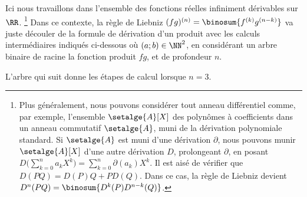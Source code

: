 Ici nous travaillons dans l'ensemble des fonctions réelles infiniment dérivables sur $\RR$.%
\footnote{
	Plus généralement, nous pouvons considérer tout anneau différentiel comme, par exemple, l'ensemble $\setalge{A}[X]$ des polynômes à coefficients dans un anneau commutatif $\setalge{A}$, muni de la dérivation polynomiale standard.
	Si $\setalge{A}$ est muni d'une dérivation $\partial$,
	nous pouvons munir $\setalge{A}[X]$ d'une autre dérivation $D$, prolongeant $\partial$, en posant
	$D \big( \sum_{k=0}^n a_k X^k \big) = \sum_{k=0}^n \partial(a_k) X^k$.
	Il est aisé de vérifier que $D(PQ) = D(P) Q + P D(Q)$.
	Dans ce cas, la règle de Liebniz devient $D^n(PQ) = \binosum{D^k(P) D^{n-k}(Q)}$.
}
Dans ce contexte,
la règle de Liebniz $(fg)^{(n)} = \binosum{f^{(k)} g^{(n-k)}}$ va juste découler de la formule de dérivation d'un produit avec les calculs intermédiaires indiqués ci-dessous où $(a;b) \in \NN^2$, en considérant un arbre binaire de racine la fonction produit $f g$, et de profondeur $n$.

%
            {\intertree}{\prodder}


L'arbre qui suit donne les étapes de calcul lorsque $n=3$.

\binotree{\prodder}


